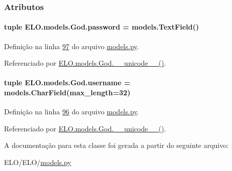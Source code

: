 \subsubsection{Atributos}
\hypertarget{classELO_1_1models_1_1God_ae566fce421f4a31517a053af2abcff31}{
\paragraph[{password}]{\setlength{\rightskip}{0pt plus 5cm}tuple E\-L\-O.\-models.\-God.\-password = models.\-Text\-Field()\hspace{0.3cm}{\ttfamily [static]}}}\label{classELO_1_1models_1_1God_ae566fce421f4a31517a053af2abcff31}


Definição na linha \hyperlink{ELO_2models_8py_source_l00097}{97} do arquivo \hyperlink{ELO_2models_8py_source}{models.\-py}.



Referenciado por \hyperlink{classELO_1_1models_1_1God_aec7e462406b98293c953589a3a368825}{E\-L\-O.\-models.\-God.\-\_\-\-\_\-unicode\-\_\-\-\_\-()}.

\hypertarget{classELO_1_1models_1_1God_a8b9ebc1601b71f2b52e72c9fbd3030bc}{
\paragraph[{username}]{\setlength{\rightskip}{0pt plus 5cm}tuple E\-L\-O.\-models.\-God.\-username = models.\-Char\-Field(max\-\_\-length=32)\hspace{0.3cm}{\ttfamily [static]}}}\label{classELO_1_1models_1_1God_a8b9ebc1601b71f2b52e72c9fbd3030bc}


Definição na linha \hyperlink{ELO_2models_8py_source_l00096}{96} do arquivo \hyperlink{ELO_2models_8py_source}{models.\-py}.



Referenciado por \hyperlink{classELO_1_1models_1_1God_aec7e462406b98293c953589a3a368825}{E\-L\-O.\-models.\-God.\-\_\-\-\_\-unicode\-\_\-\-\_\-()}.



A documentação para esta classe foi gerada a partir do seguinte arquivo\-:\begin{DoxyCompactItemize}
\item 
E\-L\-O/\-E\-L\-O/\hyperlink{ELO_2models_8py}{models.\-py}\end{DoxyCompactItemize}
